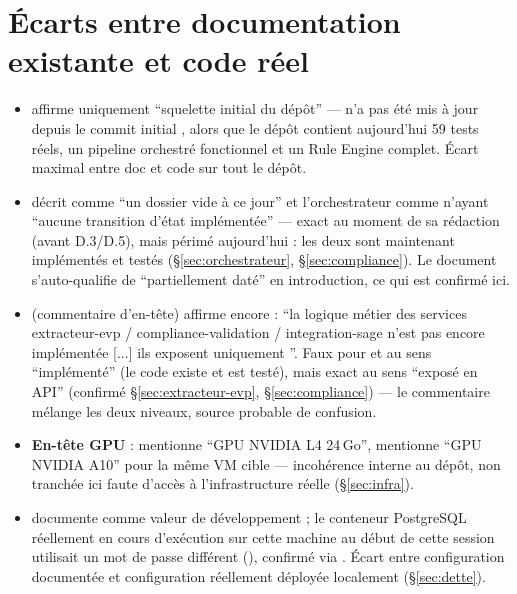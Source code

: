 \documentclass[11pt,a4paper]{article}
\begin{document}
\section{\'Ecarts entre documentation existante et code r\'eel}
\label{sec:ecarts}

\begin{itemize}[leftmargin=1.3em]
\item \textbf{} affirme uniquement ``squelette initial du d\'ep\^ot'' --- n'a pas \'et\'e mis \`a jour depuis le commit initial , alors que le d\'ep\^ot contient aujourd'hui 59 tests r\'eels, un pipeline orchestr\'e fonctionnel et un Rule Engine complet. \'Ecart maximal entre doc et code sur tout le d\'ep\^ot.
\item \textbf{} d\'ecrit  comme ``un dossier vide \`a ce jour'' et l'orchestrateur comme n'ayant ``aucune transition d'\'etat impl\'ement\'ee'' --- exact au moment de sa r\'edaction (avant D.3/D.5), mais p\'erim\'e aujourd'hui : les deux sont maintenant impl\'ement\'es et test\'es (\S\ref{sec:orchestrateur}, \S\ref{sec:compliance}). Le document s'auto-qualifie de ``partiellement dat\'e'' en introduction, ce qui est confirm\'e ici.
\item \textbf{} (commentaire d'en-t\^ete) affirme encore : ``la logique m\'etier des services extracteur-evp / compliance-validation / integration-sage n'est pas encore impl\'ement\'ee [...] ils exposent uniquement ''. Faux pour  et  au sens ``impl\'ement\'e'' (le code existe et est test\'e), mais exact au sens ``expos\'e en API'' (confirm\'e \S\ref{sec:extracteur-evp}, \S\ref{sec:compliance}) --- le commentaire mélange les deux niveaux, source probable de confusion.
\item \textbf{En-t\^ete GPU} :  mentionne ``GPU NVIDIA L4 24\,Go'',  mentionne ``GPU NVIDIA A10'' pour la m\^eme VM cible --- incoh\'erence interne au d\'ep\^ot, non tranch\'ee ici faute d'acc\`es \`a l'infrastructure r\'eelle (\S\ref{sec:infra}).
\item \textbf{} documente  comme valeur de d\'eveloppement ; le conteneur PostgreSQL r\'eellement en cours d'ex\'ecution sur cette machine au d\'ebut de cette session utilisait un mot de passe diff\'erent (), confirm\'e via . \'Ecart entre configuration document\'ee et configuration r\'eellement d\'eploy\'ee localement (\S\ref{sec:dette}).
\end{itemize}
\end{document}
